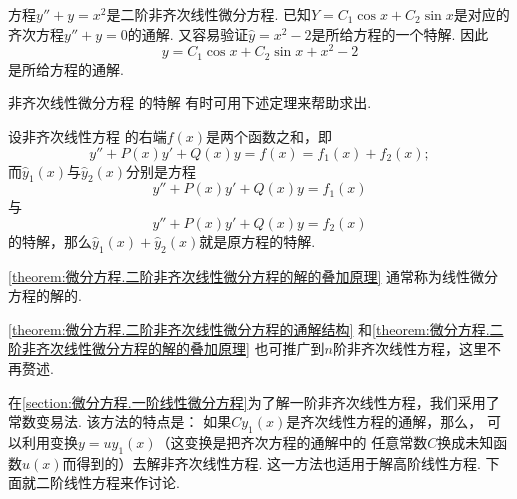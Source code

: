 \begin{example}
方程\(y'' + y = x^2\)是二阶非齐次线性微分方程.
已知\(Y = C_1 \cos x + C_2 \sin x\)是对应的齐次方程\(y'' + y = 0\)的通解.
又容易验证\(\hat{y} = x^2 - 2\)是所给方程的一个特解.
因此\begin{equation*}
	y = C_1 \cos x + C_2 \sin x + x^2 - 2
\end{equation*}是所给方程的通解.
\end{example}

非齐次线性微分方程  的特解
有时可用下述定理来帮助求出.
\begin{theorem}\label{theorem:微分方程.二阶非齐次线性微分方程的解的叠加原理}
设非齐次线性方程 
的右端\(f(x)\)是两个函数之和，即\begin{equation*}
	y''+P(x)y'+Q(x)y
	=f(x)
	=f_1(x)+f_2(x);
\end{equation*}而\(\hat{y}_1(x)\)与\(\hat{y}_2(x)\)分别是方程\begin{equation*}
	y''+P(x)y'+Q(x)y=f_1(x)
\end{equation*}与\begin{equation*}
	y''+P(x)y'+Q(x)y=f_2(x)
\end{equation*}的特解，那么\(\hat{y}_1(x)+\hat{y}_2(x)\)就是原方程的特解.
\end{theorem}

\cref{theorem:微分方程.二阶非齐次线性微分方程的解的叠加原理}
通常称为线性微分方程的解的.

\cref{theorem:微分方程.二阶非齐次线性微分方程的通解结构}
和\cref{theorem:微分方程.二阶非齐次线性微分方程的解的叠加原理}
也可推广到\(n\)阶非齐次线性方程，这里不再赘述.

在\cref{section:微分方程.一阶线性微分方程}为了解一阶非齐次线性方程，我们采用了常数变易法.
该方法的特点是：
如果\(C y_1(x)\)是齐次线性方程的通解，那么，
可以利用变换\(y = u y_1(x)\)（这变换是把齐次方程的通解中的
任意常数\(C\)换成未知函数\(u(x)\)而得到的）去解非齐次线性方程.
这一方法也适用于解高阶线性方程.
下面就二阶线性方程来作讨论.

